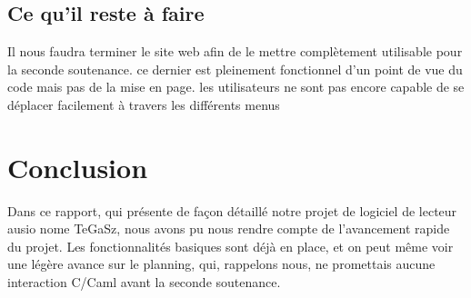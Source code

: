 \documentclass[12pt]{report}
\begin{document}
\section{Ce qu'il reste à faire}
Il nous faudra terminer le site web afin de le mettre complètement utilisable pour la seconde soutenance. ce dernier est pleinement fonctionnel d'un point de vue du code mais pas de la mise en page. les utilisateurs ne sont pas encore capable de se déplacer facilement à travers les différents menus
\chapter{Conclusion}

Dans ce rapport, qui présente de façon détaillé notre projet de logiciel de lecteur ausio nome TeGaSz, nous avons pu nous rendre compte de l'avancement rapide du projet. Les fonctionnalités basiques sont déjà en place, et on peut même voir une légère avance sur le planning, qui, rappelons nous, ne promettais aucune interaction C/Caml avant la seconde soutenance.

\end{document}
